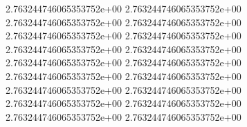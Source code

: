 	2.763244746065353752e+00	2.763244746065353752e+00	2.763244746065353752e+00	2.763244746065353752e+00	2.763244746065353752e+00	2.763244746065353752e+00	2.763244746065353752e+00	2.763244746065353752e+00	2.763244746065353752e+00	2.763244746065353752e+00	2.763244746065353752e+00	2.763244746065353752e+00	2.763244746065353752e+00	2.763244746065353752e+00	2.763244746065353752e+00	2.763244746065353752e+00	2.763244746065353752e+00	2.763244746065353752e+00
